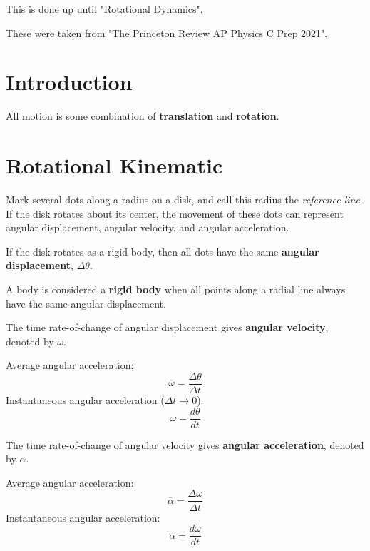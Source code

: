 \documentclass{article}
\begin{document}
\begin{inprogress}
    This is done up until "Rotational Dynamics".
\end{inprogress}

\begin{note}
    These were taken from "The Princeton Review AP Physics C Prep 2021". 
\end{note}

\section{Introduction}
All motion is some combination of \textbf{translation} and \textbf{rotation}.

\section{Rotational Kinematic}
Mark several dots along a radius on a disk, and call this radius the \textit{reference line}. If the disk rotates about its center, the movement of these dots can represent angular displacement, angular velocity, and angular acceleration.

If the disk rotates as a rigid body, then all dots have the same \textbf{angular displacement}, $\Delta \theta$.
\begin{definition}
    A body is considered a \textbf{rigid body} when all points along a radial line always have the same angular displacement.
\end{definition}

\begin{definition}
    The time rate-of-change of angular displacement gives \textbf{angular velocity}, denoted by $\omega$.
    
    Average angular acceleration:
    \begin{equation*}
        \overline{\omega} = \frac{\Delta \theta}{\Delta t}
    \end{equation*}
    Instantaneous angular acceleration ($\Delta t \rightarrow 0$): 
    \begin{equation*}
        \omega = \frac{d\theta}{dt}
    \end{equation*}
\end{definition}

\begin{definition}
    The time rate-of-change of angular velocity gives \textbf{angular acceleration}, denoted by $\alpha$.

    Average angular acceleration:
    \begin{equation*}
        \overline{\alpha} = \frac{\Delta \omega}{\Delta t}
    \end{equation*}
    Instantaneous angular acceleration:
    \begin{equation*}
        \alpha = \frac{d\omega}{dt}
    \end{equation*}
\end{definition}
\end{document}
